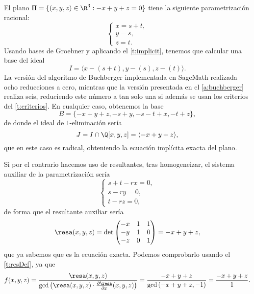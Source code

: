 \begin{ejemplo}
    El plano $\Pi = \{(x,y,z) \in \R^3 : -x+y+z=0\}$ tiene la siguiente parametrización racional:
    \begin{equation*}
        \begin{cases}
        x = s+t,\\
        y = s,\\
        z = t.
    \end{cases}
    \end{equation*}
    Usando bases de Groebner y aplicando el \autoref{t:implicit}, tenemos que calcular una base del ideal
    \begin{equation*}
        I = \langle x-(s+t), y - (s), z-(t) \rangle.
    \end{equation*}
    La versión del algoritmo de Buchberger implementada en SageMath realizada ocho reducciones a cero, mientras que la versión presentada en el \autoref{a:buchberger} realiza seis, reduciendo este número a tan solo una si además se usan los criterios del \autoref{t:criterios}. En cualquier caso, obtenemos la base
    \begin{equation*}
        B= \{-x + y + z, -s + y, -s - t + x, -t + z\},
    \end{equation*}
    de donde el ideal de $1$-eliminación sería
    \begin{equation*}
        J = I \cap \Q[x,y,z] = \langle -x + y + z  \rangle,
    \end{equation*}
    que en este caso es radical, obteniendo la ecuación implícita exacta del plano.\newline
    
    Si por el contrario hacemos uso de resultantes, tras homogeneizar, el sistema auxiliar de la parametrización sería
    \begin{equation*}
        \begin{cases}
            s+t-rx=0,\\
            s-ry=0,\\
            t-rz=0,
        \end{cases}
    \end{equation*}
    de forma que el resultante auxiliar sería
    \begin{equation*}
        \resa(x,y,z) = \det\begin{pmatrix} -x & 1 & 1\\ -y&1&0\\ -z&0&1 \end{pmatrix} = -x+y+z,
    \end{equation*}
    que ya sabemos que es la ecuación exacta. Podemos comprobarlo usando el \autoref{t:resDef}, ya que
    \begin{equation*}
        f(x,y,z) = \frac{\resa(x,y,z)}{\gcd\left( \resa(x,y,z)\cdot \frac{\partial \resa}{\partial x}(x,y,z)  \right)} = \frac{-x+y+z}{\gcd\left( -x+y+z, -1  \right)} = \frac{-x+y+z}{1}.
    \end{equation*}
\end{ejemplo}
